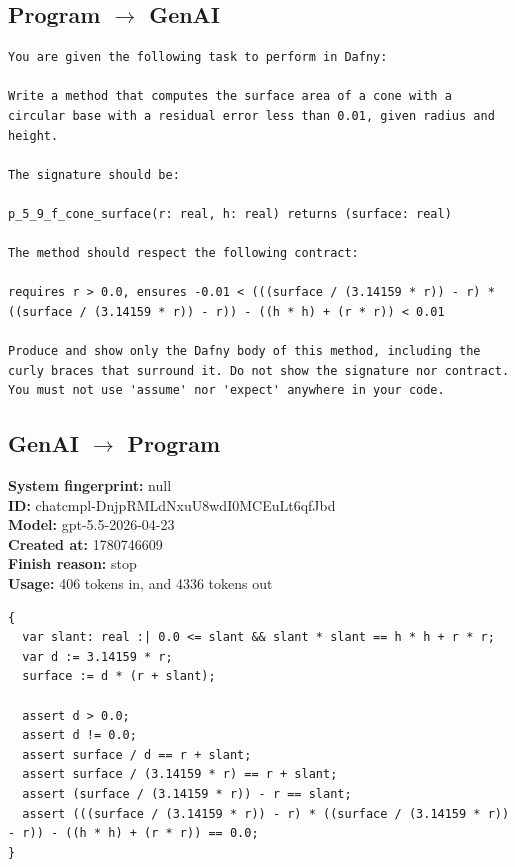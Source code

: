 \documentclass{article}
\begin{document}
\subsection*{Program $\rightarrow$ GenAI}
\begin{lstlisting}
You are given the following task to perform in Dafny:

Write a method that computes the surface area of a cone with a circular base with a residual error less than 0.01, given radius and height.

The signature should be:

p_5_9_f_cone_surface(r: real, h: real) returns (surface: real)

The method should respect the following contract:

requires r > 0.0, ensures -0.01 < (((surface / (3.14159 * r)) - r) * ((surface / (3.14159 * r)) - r)) - ((h * h) + (r * r)) < 0.01

Produce and show only the Dafny body of this method, including the curly braces that surround it. Do not show the signature nor contract. You must not use 'assume' nor 'expect' anywhere in your code.
\end{lstlisting}
\subsection*{GenAI $\rightarrow$ Program}
\textbf{System fingerprint: }null
\\\textbf{ID: }chatcmpl-DnjpRMLdNxuU8wdI0MCEuLt6qfJbd
\\\textbf{Model: }gpt-5.5-2026-04-23
\\\textbf{Created at: }1780746609
\\\textbf{Finish reason: }stop
\\\textbf{Usage: }406 tokens in, and 4336 tokens out
\begin{lstlisting}
{
  var slant: real :| 0.0 <= slant && slant * slant == h * h + r * r;
  var d := 3.14159 * r;
  surface := d * (r + slant);

  assert d > 0.0;
  assert d != 0.0;
  assert surface / d == r + slant;
  assert surface / (3.14159 * r) == r + slant;
  assert (surface / (3.14159 * r)) - r == slant;
  assert (((surface / (3.14159 * r)) - r) * ((surface / (3.14159 * r)) - r)) - ((h * h) + (r * r)) == 0.0;
}
\end{lstlisting}
\end{document}
